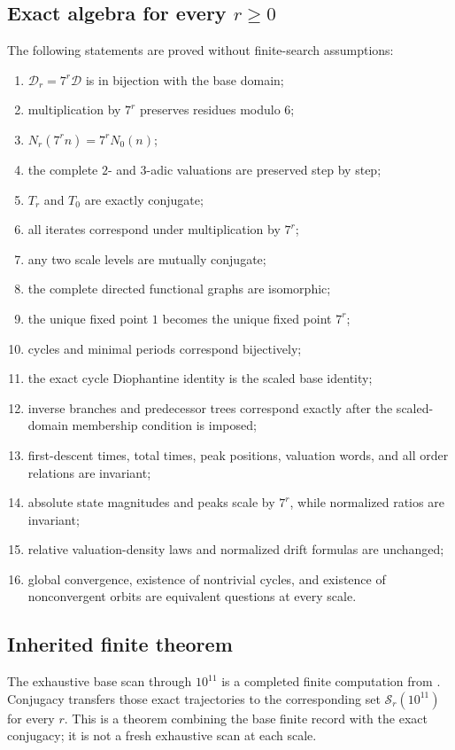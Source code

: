 \documentclass[11pt]{article}
\begin{document}
\subsection*{Exact algebra for every $r\ge0$}
The following statements are proved without finite-search assumptions:
\begin{enumerate}[label=(\roman*)]
\item $\mathcal D_r=7^r\mathcal D$ is in bijection with the base domain;
\item multiplication by $7^r$ preserves residues modulo $6$;
\item $N_r(7^rn)=7^rN_0(n)$;
\item the complete $2$- and $3$-adic valuations are preserved step by step;
\item $T_r$ and $T_0$ are exactly conjugate;
\item all iterates correspond under multiplication by $7^r$;
\item any two scale levels are mutually conjugate;
\item the complete directed functional graphs are isomorphic;
\item the unique fixed point $1$ becomes the unique fixed point $7^r$;
\item cycles and minimal periods correspond bijectively;
\item the exact cycle Diophantine identity is the scaled base identity;
\item inverse branches and predecessor trees correspond exactly after the scaled-domain membership condition is imposed;
\item first-descent times, total times, peak positions, valuation words, and all order relations are invariant;
\item absolute state magnitudes and peaks scale by $7^r$, while normalized ratios are invariant;
\item relative valuation-density laws and normalized drift formulas are unchanged;
\item global convergence, existence of nontrivial cycles, and existence of nonconvergent orbits are equivalent questions at every scale.
\end{enumerate}

\subsection*{Inherited finite theorem}
The exhaustive base scan through $10^{11}$ is a completed finite computation from \cite{Base7Paper}. Conjugacy transfers those exact trajectories to the corresponding set $\mathcal S_r(10^{11})$ for every $r$. This is a theorem combining the base finite record with the exact conjugacy; it is not a fresh exhaustive scan at each scale.
\end{document}
